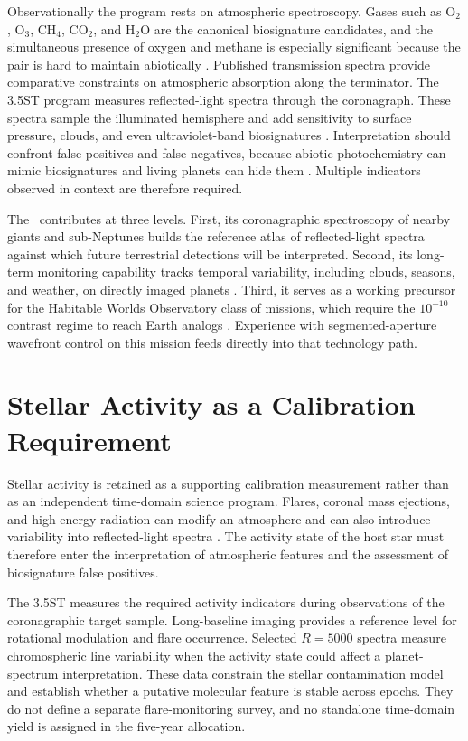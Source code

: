 Observationally the program rests on atmospheric spectroscopy. Gases
such as O$_2$, O$_3$, CH$_4$, CO$_2$, and H$_2$O are the canonical
biosignature candidates, and the simultaneous presence of oxygen and
methane is especially significant because the pair is hard to maintain
abiotically \cite{schwieterman18,claudi19}. Published transmission spectra
provide comparative constraints on
atmospheric absorption along the terminator. The 3.5ST program measures
reflected-light spectra through the coronagraph. These spectra sample the
illuminated hemisphere and add
sensitivity to surface pressure, clouds, and even ultraviolet-band
biosignatures \cite{damiano23}. Interpretation should confront
false positives and false negatives, because abiotic photochemistry can
mimic biosignatures and living planets can hide them
\cite{schwieterman18,robinson18}. Multiple indicators observed in
context are therefore required.

The \facility\ contributes at three levels. First, its coronagraphic
spectroscopy of nearby giants and sub-Neptunes builds the reference
atlas of reflected-light spectra against which future terrestrial
detections will be interpreted. Second, its long-term monitoring
capability tracks temporal variability, including clouds, seasons, and
weather, on directly imaged planets \cite{robinson18}. Third, it
serves as a working precursor for the Habitable Worlds Observatory
class of missions, which require the $10^{-10}$ contrast regime to
reach Earth analogs \cite{hwo26}. Experience with
segmented-aperture wavefront control on this mission feeds directly into
that technology path.

\section{Stellar Activity as a Calibration Requirement}
\label{sec:activity}

Stellar activity is retained as a supporting calibration measurement rather
than as an independent time-domain science program. Flares, coronal mass
ejections, and high-energy radiation can modify an atmosphere and can also
introduce variability into reflected-light spectra
\cite{airapetian17escape,chen21}. The activity state of the host star must
therefore enter the interpretation of atmospheric features and the assessment
of biosignature false positives.

The 3.5ST measures the required activity indicators during observations of
the coronagraphic target sample. Long-baseline imaging provides a reference
level for rotational modulation and flare occurrence. Selected $R=5000$
spectra measure chromospheric line variability when the activity state could
affect a planet-spectrum interpretation. These data constrain the stellar
contamination model and establish whether a putative molecular feature is
stable across epochs. They do not define a separate flare-monitoring survey,
and no standalone time-domain yield is assigned in the five-year allocation.

